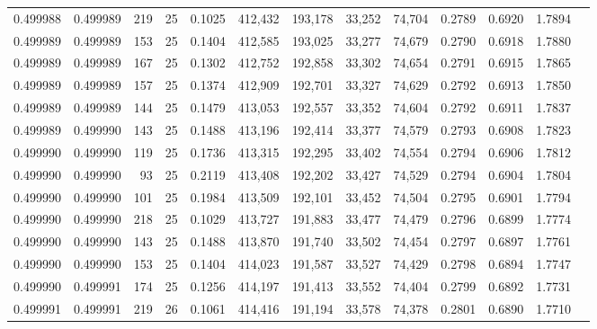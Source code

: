 \begin{tabular}{rrrrrrrrrrrrr}
0.499988 & 0.499989 &   219 &  25 &                                     0.1025 & 412,432 & 193,178 &  33,252 &  74,704 & 0.2789 & 0.6920 & 1.7894 \\
0.499989 & 0.499989 &   153 &  25 &                                     0.1404 & 412,585 & 193,025 &  33,277 &  74,679 & 0.2790 & 0.6918 & 1.7880 \\
0.499989 & 0.499989 &   167 &  25 &                                     0.1302 & 412,752 & 192,858 &  33,302 &  74,654 & 0.2791 & 0.6915 & 1.7865 \\
0.499989 & 0.499989 &   157 &  25 &                                     0.1374 & 412,909 & 192,701 &  33,327 &  74,629 & 0.2792 & 0.6913 & 1.7850 \\
0.499989 & 0.499989 &   144 &  25 &                                     0.1479 & 413,053 & 192,557 &  33,352 &  74,604 & 0.2792 & 0.6911 & 1.7837 \\
0.499989 & 0.499990 &   143 &  25 &                                     0.1488 & 413,196 & 192,414 &  33,377 &  74,579 & 0.2793 & 0.6908 & 1.7823 \\
0.499990 & 0.499990 &   119 &  25 &                                     0.1736 & 413,315 & 192,295 &  33,402 &  74,554 & 0.2794 & 0.6906 & 1.7812 \\
0.499990 & 0.499990 &    93 &  25 &                                     0.2119 & 413,408 & 192,202 &  33,427 &  74,529 & 0.2794 & 0.6904 & 1.7804 \\
0.499990 & 0.499990 &   101 &  25 &                                     0.1984 & 413,509 & 192,101 &  33,452 &  74,504 & 0.2795 & 0.6901 & 1.7794 \\
0.499990 & 0.499990 &   218 &  25 &                                     0.1029 & 413,727 & 191,883 &  33,477 &  74,479 & 0.2796 & 0.6899 & 1.7774 \\
0.499990 & 0.499990 &   143 &  25 &                                     0.1488 & 413,870 & 191,740 &  33,502 &  74,454 & 0.2797 & 0.6897 & 1.7761 \\
0.499990 & 0.499990 &   153 &  25 &                                     0.1404 & 414,023 & 191,587 &  33,527 &  74,429 & 0.2798 & 0.6894 & 1.7747 \\
0.499990 & 0.499991 &   174 &  25 &                                     0.1256 & 414,197 & 191,413 &  33,552 &  74,404 & 0.2799 & 0.6892 & 1.7731 \\
0.499991 & 0.499991 &   219 &  26 &                                     0.1061 & 414,416 & 191,194 &  33,578 &  74,378 & 0.2801 & 0.6890 & 1.7710 \\

\end{tabular}
